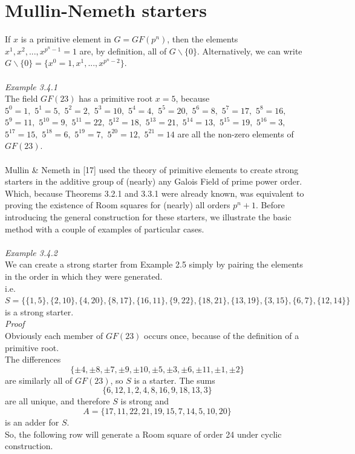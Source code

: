 \documentclass[
  12pt,
  a4paper]{book}
\begin{document}
\hypertarget{mullin-nemeth-starters}{%
\section{Mullin-Nemeth starters}\label{mullin-nemeth-starters}}

If \(x\) is a primitive element in \(G=GF(p^n)\), then the elements
\(x^1,x^2,...,x^{p^n-1}=1\) are, by definition, all of
\(G \backslash \{0\}\). Alternatively, we can write
\(G \backslash \{0\}=\{x^0=1,x^1,..., x^{p^n-2}\}\).\\
~\\
\emph{Example 3.4.1}\\
The field \(GF(23)\) has a primitive root \(x=5\), because\\
\(5^0=1,\) \(5^1=5,\) \(5^2=2,\) \(5^3=10,\) \(5^4=4,\) \(5^5=20,\)
\(5^6=8,\) \(5^7=17,\) \(5^8=16,\) \(5^9=11,\) \(5^{10}=9,\)
\(5^{11}=22,\) \(5^{12}=18,\) \(5^{13}=21,\) \(5^{14}=13,\)
\(5^{15}=19,\) \(5^{16}=3,\) \(5^{17}=15,\) \(5^{18}=6,\) \(5^{19}=7,\)
\(5^{20}=12,\) \(5^{21}=14\) are all the non-zero elements of
\(GF(23)\).\\
~\\
Mullin \& Nemeth in {[}17{]} used the theory of primitive elements to
create strong starters in the additive group of (nearly) any Galois
Field of prime power order. Which, because Theorems 3.2.1 and 3.3.1 were
already known, was equivalent to proving the existence of Room squares
for (nearly) all orders \(p^n+1\). Before introducing the general
construction for these starters, we illustrate the basic method with a
couple of examples of particular cases.\\
~\\
\emph{Example 3.4.2}\\
We can create a strong starter from Example 2.5 simply by pairing the
elements in the order in which they were generated.\\
i.e.
\(S=\{\{1,5\},\{2,10\},\{4,20\},\{8,17\},\{16,11\},\{9,22\},\{18,21\},\{13,19\},\{3,15\},\{6,7\},\{12,14\}\}\)\\
is a strong starter.\\
\emph{Proof}\\
Obviously each member of \(GF(23)\) occurs once, because of the
definition of a primitive root.\\
The differences
\[\{\pm 4, \pm 8, \pm 7, \pm 9, \pm 10, \pm 5, \pm 3, \pm 6, \pm 11, \pm 1, \pm 2\}\]
are similarly all of \(GF(23)\), so \(S\) is a starter. The sums
\[\{6,12,1,2,4,8,16,9,18,13,3\}\] are all unique, and therefore \(S\) is
strong and \[A=\{17,11,22,21,19,15,7,14,5,10,20\}\] is an adder for
\(S\).\\
So, the following row will generate a Room square of order 24 under
cyclic construction.
\end{document}
